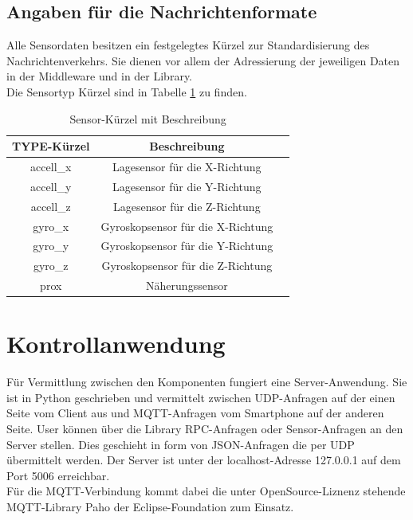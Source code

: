 \documentclass[11pt,a4paper]{report}
\begin{document}
\section{Angaben für die Nachrichtenformate}
Alle Sensordaten besitzen ein festgelegtes Kürzel zur Standardisierung des Nachrichtenverkehrs.
Sie dienen vor allem der Adressierung der jeweiligen Daten in der Middleware und in der Library.
\\
Die Sensortyp Kürzel sind in Tabelle \ref{tab:sensor_types} zu finden. 
\begin{table}[htbp]
  \centering
  \begin{tabular}{|c|c|c}
      \hline
      TYPE-Kürzel & Beschreibung \\
      \hline
      accell\_x & Lagesensor für die X-Richtung \\
      \hline
      accell\_y & Lagesensor für die Y-Richtung \\
      \hline
      accell\_z & Lagesensor für die Z-Richtung \\
      \hline
       gyro\_x & Gyroskopsensor für die X-Richtung \\
      \hline
      gyro\_y & Gyroskopsensor für die Y-Richtung \\
      \hline
      gyro\_z & Gyroskopsensor für die Z-Richtung \\
      \hline
      prox & Näherungssensor \\
      \hline

  \end{tabular}
  \caption{Sensor-Kürzel mit Beschreibung}
  \label{tab:sensor_types}
\end{table}


\chapter{Kontrollanwendung}\label{chap:server_software}

Für Vermittlung zwischen den Komponenten fungiert eine Server-Anwendung.
Sie ist in Python geschrieben und vermittelt zwischen UDP-Anfragen auf der einen Seite vom Client aus und MQTT-Anfragen vom Smartphone auf der anderen Seite.
User können über die Library RPC-Anfragen oder Sensor-Anfragen an den Server stellen.
Dies geschieht in form von JSON-Anfragen die per UDP übermittelt werden.
Der Server ist unter der localhost-Adresse 127.0.0.1 auf dem Port 5006 erreichbar.
\\
Für die MQTT-Verbindung kommt dabei die unter OpenSource-Liznenz stehende MQTT-Library Paho der Eclipse-Foundation zum Einsatz. \cite{paho}
\end{document}
